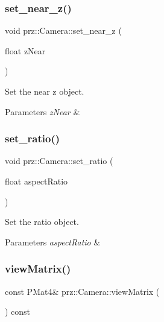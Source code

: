 \subsubsection{\texorpdfstring{set\_near\_z()}{set\_near\_z()}}
{\footnotesize\ttfamily void prz\+::\+Camera\+::set\+\_\+near\+\_\+z (\begin{DoxyParamCaption}\item[{float}]{z\+Near }\end{DoxyParamCaption})\hspace{0.3cm}{\ttfamily [inline]}}



Set the near z object. 


\begin{DoxyParams}{Parameters}
{\em z\+Near} & \\
\hline
\end{DoxyParams}
\mbox{\label{classprz_1_1_camera_ad5f11c3aace04adb03d4f7edc7aa9c66}} 
\subsubsection{\texorpdfstring{set\_ratio()}{set\_ratio()}}
{\footnotesize\ttfamily void prz\+::\+Camera\+::set\+\_\+ratio (\begin{DoxyParamCaption}\item[{float}]{aspect\+Ratio }\end{DoxyParamCaption})\hspace{0.3cm}{\ttfamily [inline]}}



Set the ratio object. 


\begin{DoxyParams}{Parameters}
{\em aspect\+Ratio} & \\
\hline
\end{DoxyParams}
\mbox{\label{classprz_1_1_camera_a5dc5b4ddc7be0671f20c19138141bdd6}} 
\subsubsection{\texorpdfstring{viewMatrix()}{viewMatrix()}}
{\footnotesize\ttfamily const P\+Mat4\& prz\+::\+Camera\+::view\+Matrix (\begin{DoxyParamCaption}{ }\end{DoxyParamCaption}) const\hspace{0.3cm}{\ttfamily [inline]}}




